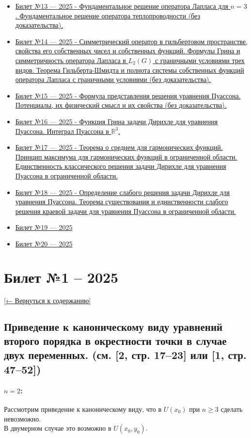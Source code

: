\documentclass[12pt, a4paper]{article}
\newcommand{\backtotoc}{\small\hyperref[toc]{[← Вернуться к содержанию]}}
\begin{document}
\begin{itemize}
    \item \hyperref[sec:ticket13]{Билет №13 — 2025 - Фундаментальное решение оператора Лапласа для $n=3$. Фундаментальное решение оператора теплопроводности (без доказательства).}
    \item \hyperref[sec:ticket14]{Билет №14 — 2025 - Симметрический оператор в гильбертовом пространстве, свойства его собственных чисел и собственных функций. Формулы Грина и симметричность оператора Лапласа в $L_2(G)$ с граничными условиями трех видов. Теорема Гильберта-Шмидта и полнота системы собственных функций оператора Лапласа с граничными условиями (без доказательства).}
    \item \hyperref[sec:ticket15]{Билет №15 — 2025 - Формула представления решения уравнения Пуассона. Потенциалы, их физический смысл и их свойства (без доказательства).}
    \item \hyperref[sec:ticket16]{Билет №16 — 2025 - Функция Грина задачи Дирихле для уравнения Пуассона. Интеграл Пуассона в $\mathbb{R}^3$.}
    \item \hyperref[sec:ticket17]{Билет №17 — 2025 - Теорема о среднем для гармонических функций. Принцип максимума для гармонических функций в ограниченной области. Единственность классического решения задачи Дирихле для уравнения Пуассона в ограниченной области.}
    \item \hyperref[sec:ticket18]{Билет №18 — 2025 - Определение слабого решения задачи Дирихле для уравнения Пуассона. Теорема существования и единственности слабого решения краевой задачи для уравнения Пуассона в ограниченной области.}
    \item \hyperref[sec:ticket19]{Билет №19 — 2025}
    \item \hyperref[sec:ticket20]{Билет №20 — 2025}
\end{itemize}

\newpage

\section*{Билет №1 -- 2025}\label{sec:ticket1}
\backtotoc
\subsection*{Приведение к каноническому виду уравнений второго порядка в окрестности точки в случае двух переменных. (см. [2, стр. 17–23] или [1, стр. 47–52])}

\paragraph{$n=2$:}
Рассмотрим приведение к каноническому виду, что в $U(x_0)$ при $n \ge 3$ сделать невозможно. \\
В двумерном случае это возможно в $U(x_0, y_0)$.
\end{document}

